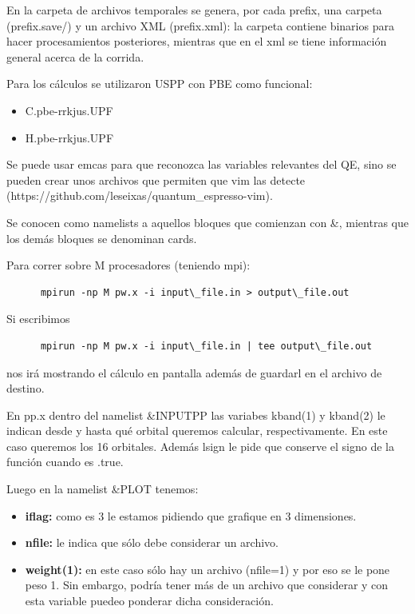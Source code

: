   En la carpeta de archivos temporales se genera, por cada prefix, una carpeta (prefix.save/) y un archivo XML (prefix.xml): la carpeta contiene binarios para hacer procesamientos posteriores, mientras que en el xml se tiene información general acerca de la corrida.

  Para los cálculos se utilizaron USPP con PBE como funcional:
    \begin{itemize}
      \item C.pbe-rrkjus.UPF
      \item H.pbe-rrkjus.UPF
    \end{itemize}

  Se puede usar emcas para que reconozca las variables relevantes del QE, sino se pueden crear unos archivos que permiten que vim las detecte (https://github.com/leseixas/quantum\_espresso-vim).

  Se conocen como namelists a aquellos bloques que comienzan con \&, mientras que los demás bloques se denominan cards.

  Para correr sobre M procesadores (teniendo mpi):
    \begin{verbatim}
      mpirun -np M pw.x -i input\_file.in > output\_file.out
    \end{verbatim}

  Si escribimos
    \begin{verbatim}
      mpirun -np M pw.x -i input\_file.in | tee output\_file.out
    \end{verbatim}

  nos irá mostrando el cálculo en pantalla además de guardarl en el archivo de destino.

  En pp.x dentro del namelist \&INPUTPP las variabes kband(1) y kband(2) le indican desde y hasta qué orbital queremos calcular, respectivamente. En este caso queremos los 16 orbitales. Además lsign le pide que conserve el signo de la función cuando es .true.

  Luego en la namelist \&PLOT tenemos:
    \begin{itemize}
      \item \textbf{iflag:} como es 3 le estamos pidiendo que grafique en 3 dimensiones.
      \item \textbf{nfile:} le indica que sólo debe considerar un archivo.
      \item \textbf{weight(1):} en este caso sólo hay un archivo (nfile=1) y por eso se le pone peso 1. Sin embargo, podría tener más de un archivo que considerar y con esta variable puedeo ponderar dicha consideración.
    \end{itemize}

